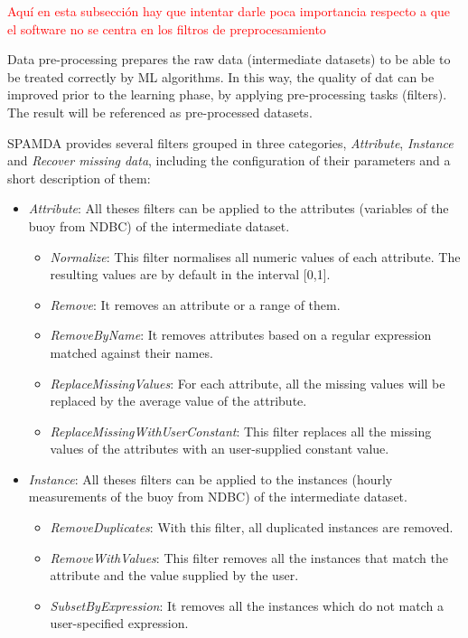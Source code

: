 \documentclass[energies,article,submit,moreauthors,pdftex]{Definitions/mdpi}
\begin{document}
				\textcolor{red}{Aquí en esta subsección hay que intentar darle poca importancia respecto a que el software no se centra en los filtros de preprocesamiento} 
				
				Data pre-processing prepares the raw data (intermediate datasets) to be able to be treated correctly by ML algorithms. In this way, the quality of dat can be improved prior to the learning phase, by applying pre-processing tasks (filters). The result will be referenced as pre-processed datasets.
				
				SPAMDA provides several filters grouped in three categories, \textit{Attribute}, \textit{Instance} and \textit{Recover missing data}, including the configuration of their parameters and a short description of them:
				
				\begin{itemize}

				 \item \textit{Attribute}: All theses filters can be applied to the attributes (variables of the buoy from NDBC) of the intermediate dataset.
				 
					\begin{itemize}
						\item \textit{Normalize}: This filter normalises all numeric values of each attribute. The resulting values are by default in the interval [0,1].
						\item \textit{Remove}: It removes an attribute or a range of them.
						\item \textit{RemoveByName}: It removes attributes based on a regular expression matched against their names.
						\item \textit{ReplaceMissingValues}: For each attribute, all the missing values will be replaced by the average value of the attribute.
						\item \textit{ReplaceMissingWithUserConstant}: This filter replaces all the missing values of the attributes with an user-supplied constant value.
					\end{itemize}
				 
				 \item \textit{Instance}: All theses filters can be applied to the instances (hourly measurements of the buoy from NDBC) of the intermediate dataset.
					\begin{itemize}
						\item \textit{RemoveDuplicates}: With this filter, all duplicated instances are removed.
						\item \textit{RemoveWithValues}: This filter removes all the instances that match the attribute and the value supplied by the user.
						\item \textit{SubsetByExpression}: It removes all the instances which do not match a user-specified expression.
					\end{itemize}
				 

\end{itemize}
\end{document}
